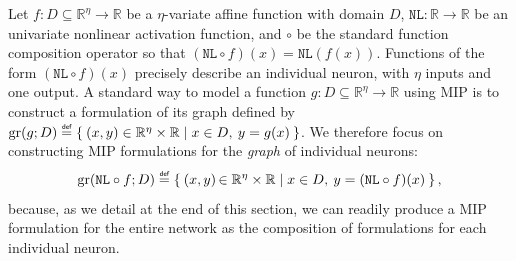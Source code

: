 \documentclass[smallextended]{svjour3}
\newcommand{\blue}[1]{{#1}}
\newcommand{\bbR}{\mathbb{R}}
\newcommand{\gr}{\operatorname{gr}}
\newcommand\defeq{\mathrel{\overset{\makebox[0pt]{\mbox{\normalfont\tiny\sffamily def}}}{=}}}
\newcommand{\NL}{\texttt{NL}}
\begin{document}
\blue{Let $f:D\subseteq \bbR^\eta \to \bbR$ be a $\eta$-variate affine function with domain $D$, $\NL{}:\bbR\to\bbR$ be an univariate nonlinear activation function, and $\circ$ be the standard function composition operator so that  $(\NL{} \circ f)(x) = \NL{}(f(x))$. Functions of the form $(\NL{} \circ f)(x)$ precisely describe an individual neuron, with $\eta$ inputs and one output. A standard way to model a function $g:D\subseteq \bbR^\eta\to \bbR$ using MIP is to construct a formulation of its graph defined by $\gr(g; D) \defeq \Set{ \left(x,y\right)\in \bbR^\eta\times \bbR | x \in D, \: y=g(x) }$.}
We \blue{therefore} focus on constructing MIP formulations for the \emph{graph} of individual neurons:
\begin{equation} \label{eqn:single-neuron}
\gr(\NL{} \circ f; D) \defeq \Set{ \left(x,\blue{y}\right)\blue{\in \bbR^\eta\times \bbR } | x \in D,\:  \blue{y=(\NL{} \circ f) (x)} },
\end{equation}
 because\blue{, as we detail at the end of this section,} we can readily produce a MIP formulation for the entire network as the composition of formulations for each individual neuron. 
\end{document}
